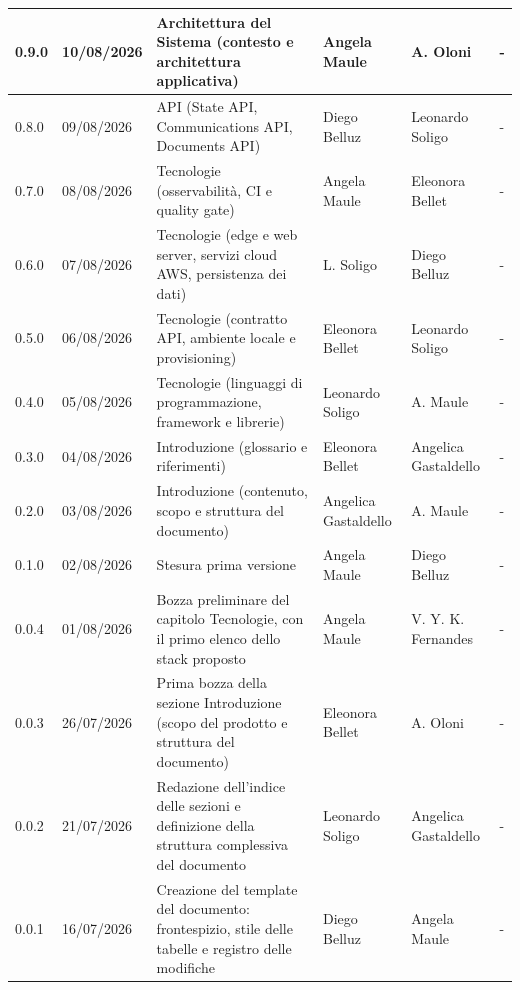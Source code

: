 \documentclass[a4paper,12pt]{article}
\begin{document}
\begin{center}
{\begin{longtable}{|p{1.4cm}|p{1.8cm}|p{5cm}|p{2.4cm}|p{2.3cm}|p{2.3cm}|}
        \hline
        0.9.0 & 10/08/2026 & Architettura del Sistema (contesto e architettura applicativa) & Angela Maule & A. Oloni & - \\
        \hline
        0.8.0 & 09/08/2026 & API (State API, Communications API, Documents API) & Diego Belluz & Leonardo Soligo & - \\
        \hline
        0.7.0 & 08/08/2026 & Tecnologie (osservabilità, CI e quality gate) & Angela Maule & Eleonora Bellet & - \\
        \hline
        0.6.0 & 07/08/2026 & Tecnologie (edge e web server, servizi cloud AWS, persistenza dei dati) & L. Soligo & Diego Belluz & - \\
        \hline
        0.5.0 & 06/08/2026 & Tecnologie (contratto API, ambiente locale e provisioning) & Eleonora Bellet & Leonardo Soligo & - \\
        \hline
        0.4.0 & 05/08/2026 & Tecnologie (linguaggi di programmazione, framework e librerie) & Leonardo Soligo & A. Maule & - \\
        \hline
        0.3.0 & 04/08/2026 & Introduzione (glossario e riferimenti) & Eleonora Bellet & Angelica Gastaldello & - \\
        \hline
        0.2.0 & 03/08/2026 & Introduzione (contenuto, scopo e struttura del documento) & Angelica Gastaldello & A. Maule & - \\
        \hline
        0.1.0 & 02/08/2026 & Stesura prima versione & Angela Maule & Diego Belluz & - \\
        \hline
        0.0.4 & 01/08/2026 & Bozza preliminare del capitolo Tecnologie, con il primo elenco dello stack proposto & Angela Maule & V. Y. K. Fernandes & - \\
        \hline
        0.0.3 & 26/07/2026 & Prima bozza della sezione Introduzione (scopo del prodotto e struttura del documento) & Eleonora Bellet & A. Oloni & - \\
        \hline
        0.0.2 & 21/07/2026 & Redazione dell'indice delle sezioni e definizione della struttura complessiva del documento & Leonardo Soligo & Angelica Gastaldello & - \\
        \hline
        0.0.1 & 16/07/2026 & Creazione del template del documento: frontespizio, stile delle tabelle e registro delle modifiche & Diego Belluz & Angela Maule & - \\
        \hline

    \end{longtable}
    }
\end{center}
\newpage
\end{document}
